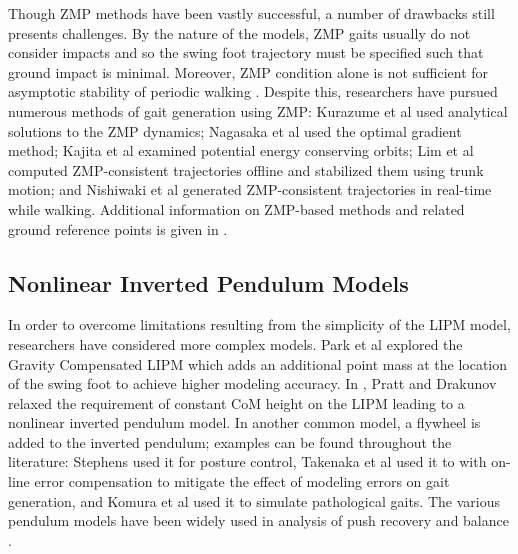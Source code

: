 Though ZMP methods have been vastly successful, a number of drawbacks still
presents challenges.
%
By the nature of the models, ZMP gaits usually do not consider impacts and so
the swing foot trajectory must be specified such that ground impact is minimal.
%
Moreover, ZMP condition alone is not sufficient for asymptotic stability of
periodic walking \cite{Choi2005}.
%
Despite this, researchers have pursued numerous methods of gait generation using
ZMP:
%
Kurazume et al \cite{Kurazume2003} used analytical solutions to the ZMP
dynamics;
%
Nagasaka et al \cite{Nagasaka1999} used the optimal gradient method;
%
Kajita et al \cite{Kajita1992} examined potential energy conserving orbits;
%
Lim et al \cite{Lim2002} computed ZMP-consistent trajectories offline and
stabilized them using trunk motion;
%
and Nishiwaki et al \cite{Nishiwaki2002} generated ZMP-consistent trajectories
in real-time while walking.
%
Additional information on ZMP-based methods and related ground reference points
is given in \cite{Goswami1999, Vukobratovic2004, Vukobratovic2006,
  Popovic2005}.

%

\subsection{Nonlinear Inverted Pendulum Models}

In order to overcome limitations resulting from the simplicity of the LIPM
model, researchers have considered more complex models.
%
Park et al \cite{Park1998} explored the Gravity Compensated LIPM which adds an
additional point mass at the location of the swing foot to achieve higher
modeling accuracy.
%
In \cite{Pratt2007}, Pratt and Drakunov relaxed the requirement of constant CoM
height on the LIPM leading to a nonlinear inverted pendulum model.
%
In another common model, a flywheel is added to the inverted pendulum;
%
examples can be found throughout the literature:
%
Stephens \cite{Stephens2011} used it for posture control,
%
Takenaka et al \cite{Takenaka2009} used it to with on-line error compensation to
mitigate the effect of modeling errors on gait generation,
%
and Komura et al \cite{Komura2005} used it to simulate pathological gaits.
%
The various pendulum models have been widely used in analysis of push recovery
and balance \cite{Takanishi1990, Hof2005, Hyon2007, Stephens2007}.

